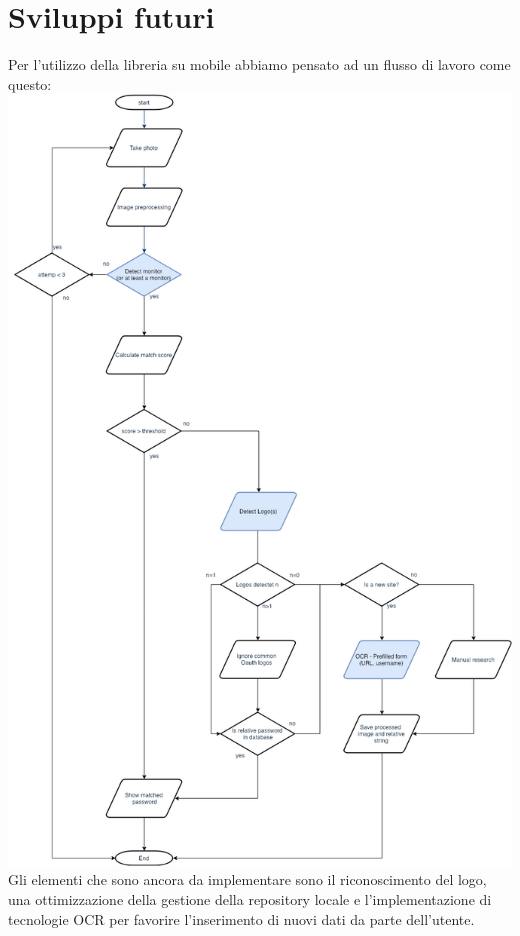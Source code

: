 \documentclass[twoside]{supsistudent}
\newcommand{\Decaa}{\newline\vspace{0.5mm}\newline\noindent}
\begin{document}
\section{Sviluppi futuri}%
Per l'utilizzo della libreria su mobile abbiamo pensato ad un flusso di lavoro come questo:
\Decaa
\includegraphics[width=\textwidth]{Pictures/flusso2.png}
\Decaa
Gli elementi che sono ancora da implementare sono il riconoscimento del logo, una ottimizzazione della gestione della repository locale e l'implementazione di tecnologie OCR per favorire l'inserimento di nuovi dati da parte dell'utente.
\end{document}
